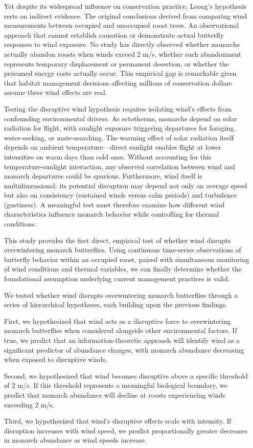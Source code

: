 Yet despite its widespread influence on conservation practice, Leong's hypothesis rests on indirect evidence. The original conclusions derived from comparing wind measurements between occupied and unoccupied roost trees. An observational approach that cannot establish causation or demonstrate actual butterfly responses to wind exposure. No study has directly observed whether monarchs actually abandon roosts when winds exceed 2 m/s, whether such abandonment represents temporary displacement or permanent desertion, or whether the presumed energy costs actually occur. This empirical gap is remarkable given that habitat management decisions affecting millions of conservation dollars assume these wind effects are real.

Testing the disruptive wind hypothesis requires isolating wind's effects from confounding environmental drivers. As ectotherms, monarchs depend on solar radiation for flight, with sunlight exposure triggering departures for foraging, water-seeking, or mate-searching. The warming effect of solar radiation itself depends on ambient temperature—direct sunlight enables flight at lower intensities on warm days than cold ones. Without accounting for this temperature-sunlight interaction, any observed correlation between wind and monarch departures could be spurious. Furthermore, wind itself is multidimensional: its potential disruption may depend not only on average speed but also on consistency (sustained winds versus calm periods) and turbulence (gustiness). A meaningful test must therefore examine how different wind characteristics influence monarch behavior while controlling for thermal conditions.

This study provides the first direct, empirical test of whether wind disrupts overwintering monarch butterflies. Using continuous time-series observations of butterfly behavior within an occupied roost, paired with simultaneous monitoring of wind conditions and thermal variables, we can finally determine whether the foundational assumption underlying current management practices is valid.

We tested whether wind disrupts overwintering monarch butterflies through a series of hierarchical hypotheses, each building upon the previous findings.

First, we hypothesized that wind acts as a disruptive force to overwintering monarch butterflies when considered alongside other environmental factors. If true, we predict that an information-theoretic approach will identify wind as a significant predictor of abundance changes, with monarch abundance decreasing when exposed to disruptive winds.

Second, we hypothesized that wind becomes disruptive above a specific threshold of 2 m/s. If this threshold represents a meaningful biological boundary, we predict that monarch abundance will decline at roosts experiencing winds exceeding 2 m/s.

Third, we hypothesized that wind's disruptive effects scale with intensity. If disruption increases with wind speed, we predict proportionally greater decreases in monarch abundance as wind speeds increase.